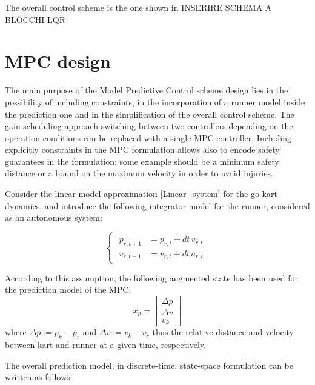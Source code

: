 \documentclass[a4paper,12pt,oneside]{book}
\begin{document}
The overall control scheme is the one shown in INSERIRE SCHEMA A BLOCCHI LQR  

\section{MPC design}
The main purpose of the Model Predictive Control scheme design lies in the possibility of including constraints, in the incorporation of a runner model inside the prediction one and in the simplification of the overall control scheme.
The gain scheduling approach switching between two controllers depending on the operation conditions can be replaced with a single MPC controller.
Including explicitly constraints in the MPC formulation allows also to encode safety guarantees in the formulation: some example should be a minimum safety distance or a bound on the maximum velocity in order to avoid injuries.

\bigskip
Consider the linear model approximation \ref{Linear_system} for the go-kart dynamics, and introduce the following integrator model for the runner, considered as an autonomous system:

\begin{equation}
\begin{cases}
	\begin{aligned}
		p_{r,t+1} &= p_{r,t} + dt \, v_{r,t} \\
		v_{r,t+1} &= v_{r,t} + dt \, a_{r,t}
	\end{aligned}
\end{cases}
\label{Runner_model}
\end{equation}

According to this assumption, the following augmented state has been used for the prediction model of the MPC:
\begin{equation}
    x_p = 
    \begin{bmatrix}
        \Delta p  \\
        \Delta v \\
        v_k
    \end{bmatrix}
\end{equation}
where $\Delta p := p_k - p_r$ and $\Delta v := v_k - v_r$ thus the relative distance and velocity between kart and runner at a given time, respectively.

The overall prediction model, in discrete-time, state-space formulation can be written as follows:
\end{document}
